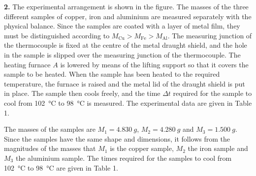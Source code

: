 \textbf{2.} The experimental arrangement is shown in the figure. The masses of the three different samples of copper, iron and aluminium are measured separately with the physical balance. Since the samples are coated with a layer of metal film, they must be distinguished according to $M_{\mathrm{Cu}}>M_{\mathrm{Fe}}>M_{\mathrm{Al}}$. The measuring junction of the thermocouple is fixed at the centre of the metal draught shield, and the hole in the sample is slipped over the measuring junction of the thermocouple. The heating furnace $A$ is lowered by means of the lifting support so that it covers the sample to be heated. When the sample has been heated to the required temperature, the furnace is raised and the metal lid of the draught shield is put in place. The sample then cools freely, and the time $\Delta t$ required for the sample to cool from \SI{102}{\celsius} to \SI{98}{\celsius} is measured. The experimental data are given in Table 1.

The masses of the samples are $M_1=\SI{4.830}{g}$, $M_2=\SI{4.280}{g}$ and $M_3=\SI{1.500}{g}$. Since the samples have the same shape and dimensions, it follows from the magnitudes of the masses that $M_1$ is the copper sample, $M_2$ the iron sample and $M_3$ the aluminium sample. The times required for the samples to cool from \SI{102}{\celsius} to \SI{98}{\celsius} are given in Table 1.

